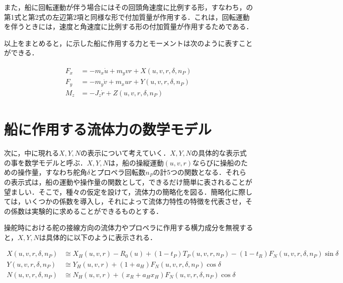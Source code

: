 また，船に回転運動が伴う場合にはその回頭角速度に比例する形，すなわち，の第1式と第2式の左辺第2項と同様な形で付加質量が作用する．これは，回転運動を伴うときには，速度と角速度に比例する形の付加質量が作用するためである．

以上をまとめると，に示した船に作用する力とモーメントは次のように表すことができる．

\begin{align}
    \begin{split}
        F_{x}&=-m_{x} \dot{u}+m_{y} v r+X\left(u, v, r, \delta, n_{P}\right) \\
        F_{y}&=-m_{y} \dot{v}+m_{x} u r+Y\left(u, v, r, \delta, n_{P}\right) \\
        M_{z}&=-J_{z} \dot{r}+Z\left(u, v, r, \delta, n_{P}\right) \label{eq:2-20}
    \end{split}
\end{align}

\section{船に作用する流体力の数学モデル}

次に，中に現れる$X,Y,N$の表示について考えていく．$X,Y,N$の具体的な表示式の事を数学モデルと呼ぶ．$X,Y,N$は，船の操縦運動$(u,v,r)$ならびに操船のための操作量，すなわち舵角$\delta$とプロペラ回転数$n_P$の計5つの関数となる．それらの表示式は，船の運動や操作量の関数として，できるだけ簡単に表されることが望ましい．そこで，種々の仮定を設けて，流体力の簡略化を図る．簡略化に際しては，いくつかの係数を導入し，それによって流体力特性の特徴を代表させ，その係数は実験的に求めることができるものとする．

操舵時における舵の接線方向の流体力やプロペラに作用する横力成分を無視すると，$X,Y,N$は具体的に以下のように表示される．

\begin{align}
    X\left(u, v, r, \delta, n_{P}\right) &\cong X_{H}(u, v, r)-R_{0}(u)+\left(1-t_{P}\right) T_{P}\left(u, v, r, n_{P}\right) - \left(1-t_{R}\right) F_{N}\left(u, v, r, \delta, n_{P}\right) \sin \delta  \label{eq:2-21} \\
    Y\left(u, v, r, \delta, n_{P}\right) &\cong Y_{H}(u, v, r)+\left(1+a_{H}\right) F_{N}\left(u, v, r, \delta, n_{P}\right) \cos \delta  \label{eq:2-22} \\
    N\left(u, v, r, \delta, n_{P}\right) &\cong N_{H}(u, v, r)+\left(x_{R}+a_{H} x_{H}\right) F_{N}\left(u, v, r, \delta, n_{P}\right) \cos \delta \label{eq:2-23}
\end{align}


